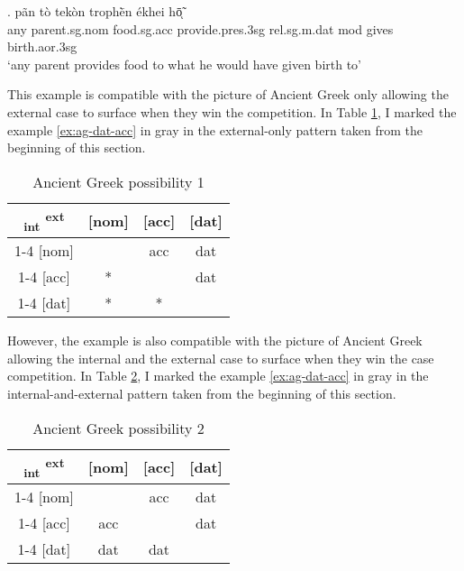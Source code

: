 \exg. pãn {tò tekòn} trophḕn ékhei hō̃ͅ  \\
any parent.\ac{sg}.\ac{nom} food.\ac{sg}.\ac{acc} provide.\ac{pres}.3\ac{sg} \ac{rel}.\ac{sg}.\ac{m}.\ac{dat} \ac{mod} {gives birth}.\ac{aor}.3\ac{sg}\\
`any parent provides food to what he would have given birth to' \label{ex:ag-dat-acc}

This example is compatible with the picture of Ancient Greek only allowing the external case to surface when they win the competition. In Table \ref{tbl:case-competition-ag-poss1}, I marked the example \ref{ex:ag-dat-acc} in gray in the external-only pattern taken from the beginning of this section.

\begin{table}[H]
  \center
  \caption{Ancient Greek possibility 1}
  \begin{tabular}{c|c|c|c}
    \toprule
    \textsubscript{\ac{int}} \textsuperscript{\ac{ext}}
           & [\ac{nom}]
           & [\ac{acc}]
           & [\ac{dat}]
           \\ \cmidrule{1-4}
       [\ac{nom}]
           &
           & \ac{acc}
           & \ac{dat}
           \\ \cmidrule{1-4}
       [\ac{acc}]
           & *
           &
           & \cellcolor{LG}\ac{dat}
           \\ \cmidrule{1-4}
       [\ac{dat}]
           & *
           & *
           &
           \\
     \bottomrule
  \end{tabular}
    \label{tbl:case-competition-ag-poss1}
\end{table}

However, the example is also compatible with the picture of Ancient Greek allowing the internal and the external case to surface when they win the case competition. In Table \ref{tbl:case-competition-ag-poss2}, I marked the example \ref{ex:ag-dat-acc} in gray in the internal-and-external pattern taken from the beginning of this section.

\begin{table}[H]
  \center
  \caption{Ancient Greek possibility 2}
  \begin{tabular}{c|c|c|c}
    \toprule
    \textsubscript{\ac{int}} \textsuperscript{\ac{ext}}
           & [\ac{nom}]
           & [\ac{acc}]
           & [\ac{dat}]
           \\ \cmidrule{1-4}
       [\ac{nom}]
           &
           & \ac{acc}
           & \ac{dat}
           \\ \cmidrule{1-4}
       [\ac{acc}]
           & \ac{acc}
           &
           & \cellcolor{LG}\ac{dat}
           \\ \cmidrule{1-4}
       [\ac{dat}]
           & \ac{dat}
           & \ac{dat}
           &
           \\
     \bottomrule
  \end{tabular}
    \label{tbl:case-competition-ag-poss2}
\end{table}

